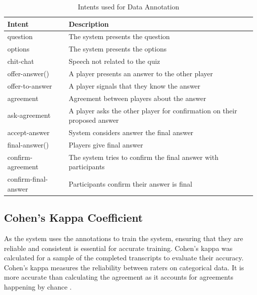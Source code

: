 \documentclass[hidelinks, 11pt]{article}
\begin{document}
\noindent
\begin{table}
  \begin{tabular}{ | p{2.5cm} | p{5cm} | }
    \hline
    \rowcolor{lightgray}
    Intent               & Description                                                              \\
    \hline
    question             & The system presents the question                                         \\
    \hline
    options              & The system presents the options                                          \\
    \hline
    chit-chat            & Speech not related to the quiz                                           \\
    \hline
    offer-answer()       & A player presents an answer to the other player                          \\
    \hline
    offer-to-answer      & A  player signals that they know the answer                              \\
    \hline
    agreement            & Agreement between players about the answer                               \\
    \hline
    ask-agreement        & A player asks the other player for confirmation on their proposed answer \\
    \hline
    accept-answer        & System considers answer the final answer                                 \\
    \hline
    final-answer()       & Players give final answer                                                \\
    \hline
    confirm-agreement    & The system tries to confirm the final answer with participants           \\
    \hline
    confirm-final-answer & Participants confirm their answer is final                               \\
    \hline
  \end{tabular}
  \caption{Intents used for Data Annotation}
  \label{table:intents}
\end{table}

\subsection{Cohen's Kappa Coefficient}
As the system uses the annotations to train the system, ensuring that they are reliable and consistent is essential for accurate training. Cohen's kappa was calculated for a sample of the completed transcripts to evaluate their accuracy. Cohen's kappa measures the reliability between raters on categorical data. It is more accurate than calculating the agreement as it accounts for agreements happening by chance \cite{Cohen_1960}.
\end{document}
